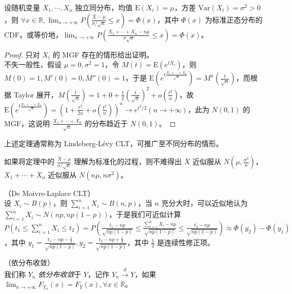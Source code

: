 \documentclass[../main.tex]{subfiles}
\begin{document}
\begin{theorem}\label{thm:5.3.1}
    设随机变量 $X_1,\cdots,X_n$ 独立同分布，均值 $\mathrm E(X_i)=\mu$，方差 $\mathrm{Var}(X_i)=\sigma^2>0$，则 $\forall x\in\mathbb R,\lim_{n\rightarrow+\infty}P\left(\frac{\bar X-\mu}{\sigma/\sqrt n}\leq x\right)=\Phi(x)$，其中 $\Phi(x)$ 为标准正态分布的 CDF。或等价地，$\lim_{n\rightarrow+\infty}P\left(\frac{X_1+\cdots+X_n-n\mu}{\sigma\sqrt n}\leq x\right)=\Phi(x)$。
\end{theorem}

\begin{proof}
    只对 $X_i$ 的 MGF 存在的情形给出证明。\\
    不失一般性，假设 $\mu=0,\sigma^2=1$，令 $M(t)=\mathrm E(e^{tX_i})$，则 $M(0)=1,M'(0)=0,M''(0)=1$，于是 $\mathrm E(e^{t\frac{X_1+\cdots+X_n}{\sqrt n}})=M^n\left(\frac t{\sqrt n}\right)$，而根据 Taylor 展开，$M\left(\frac t{\sqrt n}\right)=1+0+\frac12\left(\frac t{\sqrt n}\right)^2+o\left(\frac{t^2}n\right)$，故 $\mathrm E(e^{t\frac{X_1+\cdots+X_n}{\sqrt n}})=(1+\frac{t^2}{2n}+o(\frac{t^2} n))^n\rightarrow e^{t^2/2}(n\rightarrow+\infty)$，此为 $N(0,1)$ 的 MGF，这说明 $\frac{X_1+\cdots+X_n}{\sqrt n}$ 的分布趋近于 $N(0,1)$。
\end{proof}

上述定理通常称为 Lindeberg-Lévy CLT，可推广至不同分布的情形。

如果将定理中的 $\frac{\bar X-\mu}{\sigma/\sqrt n}$ 理解为标准化的过程，则不难得出 $\bar X$ 近似服从 $N(\mu,\frac{\sigma^2}n)$，$X_1+\cdots+X_n$ 近似服从 $N(n\mu,n\sigma^2)$。

\begin{example}
    （De Moivre-Laplace CLT）\\
    设 $X_i\sim B(p)$，则 $\sum_{i=1}^nX_i\sim B(n,p)$，当 $n$ 充分大时，可以近似地认为 $\sum_{i=1}^nX_i\sim N(np,np(1-p))$，于是我们可近似计算 $P(t_1\leq \sum_{i=1}^nX_i\leq t_2)=P\left(\frac{t_1-np}{\sqrt{np(1-p)}}\leq\frac{\sum_{i=1}^nX_i-np}{\sqrt{np(1-p)}}\leq\frac{t_2-np}{\sqrt{np(1-p)}}\right)\approx \Phi(y_2)-\Phi(y_1)$，其中 $y_1=\frac{t_1-np-\frac12}{\sqrt{np(1-p)}},y_2=\frac{t_2-np+\frac12}{\sqrt{np(1-p)}}$，其中 $\frac12$ 是连续性修正项。
\end{example}

\begin{definition}\label{def:5.3.1}
    （依分布收敛）\\
    我们称 $Y_n$ \emph{依分布收敛}于 $Y$，记作 $Y_n\overset{d}{\rightarrow}Y$，如果 $\lim_{n\rightarrow+\infty}F_{Y_n}(x)=F_Y(x),\forall x\in\mathbb R$。
\end{definition}
\end{document}
